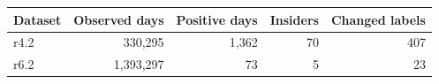 \begin{tabular}{lrrrr}
\toprule
Dataset & Observed days & Positive days & Insiders & Changed labels \\
\midrule
r4.2 & 330,295 & 1,362 & 70 & 407 \\
r6.2 & 1,393,297 & 73 & 5 & 23 \\
\bottomrule
\end{tabular}
